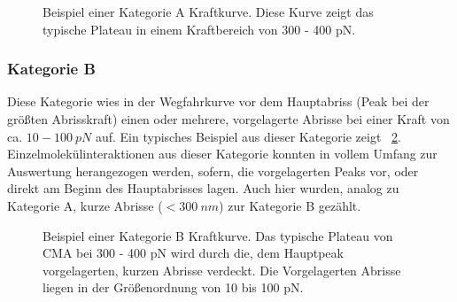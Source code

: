 \begin{figure}[H]
	\centering
	\caption[Beispiel einer Kategorie A Kraftkurve]{Beispiel einer Kategorie A Kraftkurve. Diese Kurve zeigt das typische Plateau in einem Kraftbereich von 300 - 400 pN.}
	\label{fig:kategoire_a_kurve}
\end{figure}

\subsubsection{Kategorie B}
\label{subsubsec:kategorie_b}

Diese Kategorie wies in der Wegfahrkurve vor dem Hauptabriss (Peak bei der größten Abrisskraft) einen oder mehrere, vorgelagerte Abrisse bei einer Kraft von ca. $10-100~pN$ auf. Ein typisches Beispiel aus dieser Kategorie zeigt \abb~\ref{fig:kategorie_b_kurve}. Einzelmolekülinteraktionen aus dieser Kategorie konnten in vollem Umfang zur Auswertung herangezogen werden, sofern, die vorgelagerten Peaks vor, oder direkt am Beginn des Hauptabrisses lagen. Auch hier wurden, analog zu Kategorie A, kurze Abrisse ($< 300~nm$) zur Kategorie B gezählt.

\begin{figure}[H]
	\centering
	\caption[Beispiel einer Kategorie B Kraftkurve]{Beispiel einer Kategorie B Kraftkurve. Das typische Plateau von \acs*{CMA} bei 300 - 400 pN wird durch die, dem Hauptpeak vorgelagerten, kurzen Abrisse verdeckt. Die Vorgelagerten Abrisse liegen in der Größenordnung von 10 bis 100 pN.}
	\label{fig:kategorie_b_kurve}
\end{figure}

